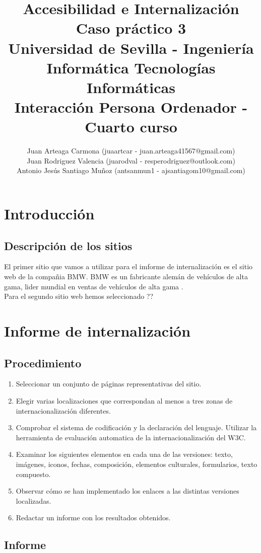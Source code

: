 \documentclass[a4paper,11pt]{article}
\title{
        \textbf{Accesibilidad e Internalización}\large\\
        \textbf{Caso práctico 3}\\
        \medskip
        Universidad de Sevilla - Ingeniería Informática Tecnologías Informáticas\\
        Interacción Persona Ordenador - Cuarto curso}
\author{Juan Arteaga Carmona (juaartcar - juan.arteaga41567@gmail.com)\\
        Juan Rodriguez Valencia (juarodval - resperodriguez@outlook.com)\\
        Antonio Jesús Santiago Muñoz (antsanmun1 - ajsantiagom10@gmail.com)\\
}
\begin{document}
\maketitle

\newpage
\tableofcontents
\listoffigures
\newpage


\section{Introducción}
\subsection{Descripción de los sitios}
El primer sitio que vamos a utilizar para el imforme de internalización es el sitio web de la compañia BMW. BMW es un fabricante alemán de vehículos de alta gama, lider mundial en ventas de vehículos de alta gama \cite{bmwref3}.\\
Para el segundo sitio web hemos seleccionado ??

\section{Informe de internalización}
\subsection{Procedimiento}
\begin{enumerate}
  \item Seleccionar un conjunto de páginas representativas del sitio.
  \item Elegir varias localizaciones que correspondan al menos a tres zonas de internacionalización diferentes.
  \item Comprobar el sistema de codificación y la declaración del lenguaje. Utilizar la herramienta de evaluación automatica de la internacionalización del W3C. \cite{w3cinter}
  \item Examinar los siguientes elementos en cada una de las versiones: texto, imágenes, iconos, fechas, composición, elementos culturales, formularios, texto compuesto.
  \item Observar cómo se han implementado los enlaces a las distintas versiones localizadas.
  \item Redactar un informe con los resultados obtenidos.
\end{enumerate}


\subsection{Informe}
\end{document}
